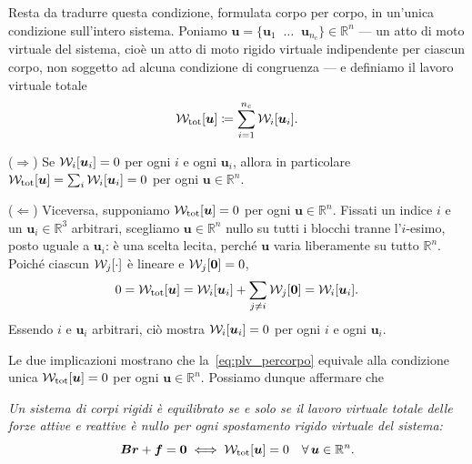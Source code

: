 \medskip

Resta da tradurre questa condizione, formulata corpo per corpo,
in un'unica condizione sull'intero sistema. Poniamo
$\bm u=\{\bm u_1 \;\;\dots \;\;\bm u_{n_c}\}\in\mathbb R^n$ --- un atto di
moto virtuale del sistema, cioè un atto di moto rigido virtuale
indipendente per ciascun corpo, non soggetto ad alcuna
condizione di congruenza --- e definiamo il lavoro virtuale
totale
\begin{equation}
	\mathcal{W}_{\rm tot}[\bm u] \coloneqq \sum_{i=1}^{n_c} \mathcal{W}_i[\bm u_i].
\end{equation}

($\Rightarrow$) Se $\mathcal{W}_i[\bm u_i]=0$ per ogni $i$ e ogni
$\bm u_i$, allora in particolare $\mathcal{W}_{\rm tot}[\bm u]=
\sum_i \mathcal{W}_i[\bm u_i]=0$ per ogni $\bm u\in\mathbb R^n$.

($\Leftarrow$) Viceversa, supponiamo $\mathcal{W}_{\rm tot}[\bm u]=0$
per ogni $\bm u\in\mathbb R^n$. Fissati un indice $i$ e un
$\bm u_i\in\mathbb R^3$ arbitrari, scegliamo $\bm u\in\mathbb
R^n$ nullo su tutti i blocchi tranne l'$i$-esimo, posto uguale
a $\bm u_i$: è una scelta lecita, perché $\bm u$ varia
liberamente su tutto $\mathbb R^n$. Poiché ciascun
$\mathcal{W}_j[\cdot]$ è lineare e $\mathcal{W}_j[\bm 0]=0$,
\[
0 = \mathcal{W}_{\rm tot}[\bm u] = \mathcal{W}_i[\bm u_i] + \sum_{j\neq i}\mathcal{W}_j[\bm 0]
= \mathcal{W}_i[\bm u_i].
\]
Essendo $i$ e $\bm u_i$ arbitrari, ciò mostra $\mathcal{W}_i[\bm u_i]=0$
per ogni $i$ e ogni $\bm u_i$.

Le due implicazioni mostrano che la~\eqref{eq:plv_percorpo}
equivale alla condizione unica $\mathcal{W}_{\rm tot}[\bm u]=0$ per ogni
$\bm u\in\mathbb R^n$. Possiamo dunque affermare che 

\bigskip

\emph{Un sistema di corpi rigidi è equilibrato se e solo se il lavoro
virtuale totale delle forze attive e reattive è nullo per ogni
spostamento rigido virtuale del sistema:
\begin{equation}\label{eq:plv_SCR}
	\bm B\bm r+\bm f=\bm 0 \iff \mathcal{W}_{\rm tot}[\bm u]=0
	\quad \forall\,\bm u\in\mathbb R^n.
\end{equation}
}
%

